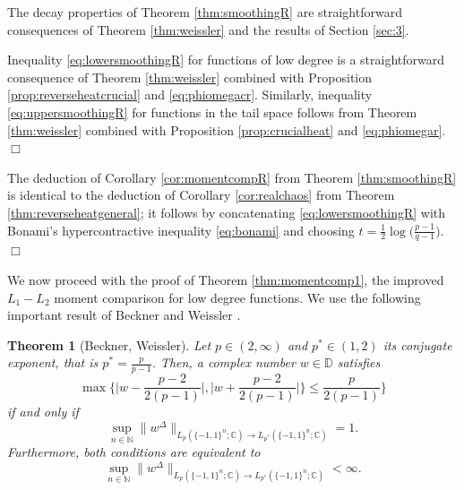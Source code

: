 \documentclass[11pt,reqno]{amsart}
\renewcommand{\leq}{\leqslant}
\newcommand{\1}{\mathbf 1}
\newtheorem{theorem}{Theorem}
\theoremstyle{remark}
\newcommand{\C}{\mathbb C}
\newcommand{\mb}{\mathbb}
\begin{document}
The decay properties of Theorem \ref{thm:smoothingR} are straightforward consequences of Theorem \ref{thm:weissler} and the results of Section \ref{sec:3}.

\medskip

Inequality \eqref{eq:lowersmoothingR} for functions of low degree is a straightforward consequence of Theorem \ref{thm:weissler} combined with Proposition \ref{prop:reverseheatcrucial} and \eqref{eq:phiomegacr}. Similarly, inequality \eqref{eq:uppersmoothingR} for functions in the tail space follows from Theorem \ref{thm:weissler} combined with Proposition \ref{prop:crucialheat} and \eqref{eq:phiomegar}.
\hfill$\Box$

\medskip

The deduction of Corollary \ref{cor:momentcompR} from Theorem \ref{thm:smoothingR} is identical to the deduction of Corollary \ref{cor:realchaos} from Theorem \ref{thm:reverseheatgeneral}; it follows by concatenating \eqref{eq:lowersmoothingR} with Bonami's hypercontractive inequality \eqref{eq:bonami} and choosing $t=\frac{1}{2}\log\big(\frac{p-1}{q-1}\big)$.
\hfill$\Box$

\medskip

We now proceed with the proof of Theorem \ref{thm:momentcomp1}, the improved $L_1-L_2$ moment comparison for low degree functions. We use the following important result of Beckner \cite{Bec75} and Weissler \cite{Wei79}.

\begin{theorem} [Beckner, Weissler] \label{thm:beckner}
Let $p\in(2,\infty)$ and $p^\ast \in(1,2)$ its conjugate exponent, that is $p^\ast = \frac{p}{p-1}$. Then, a complex number $w\in\mb{D}$ satisfies
\begin{equation} \label{eq:becknerassumption}
\max\Big\{ \Big|w-\frac{p-2}{2(p-1)}\Big|, \Big|w+\frac{p-2}{2(p-1)}\Big| \Big\} \leq \frac{p}{2(p-1)} \Big\}
\end{equation}
if and only if
\begin{equation} \label{eq:becknerconclusion}
\sup_{n\in\mb{N}} \|w^{\Delta}\|_{{L_p(\{-1,1\}^n;\C)}\to {L_{p^\ast}(\{-1,1\}^n;\C)}} =1.
\end{equation}
Furthermore, both conditions are equivalent to
\begin{equation}
\sup_{n\in\mb{N}} \|w^{\Delta}\|_{{L_p(\{-1,1\}^n;\C)}\to {L_{p^\ast}(\{-1,1\}^n;\C)}} <\infty.
\end{equation}
\end{theorem}
\end{document}
